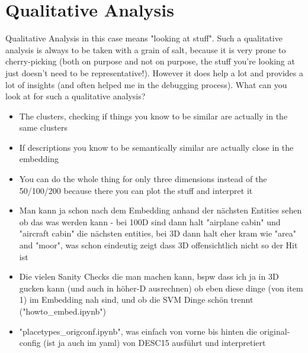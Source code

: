\documentclass[11pt,
  paper=a4, 
  twoside,  %
  hidelinks,
  bibliography=totocnumbered,
	captions=tableheading,
	BCOR=10mm
]{scrreprt}
\theoremstyle{definition}
\begin{document}
\section{Qualitative Analysis}

Qualitative Analysis in this case means "looking at stuff". Such a qualitative analysis is always to be taken with a grain of salt, because it is very prone to cherry-picking (both on purpose and not on purpose, the stuff you're looking at just doesn't need to be representative!). However it does help a lot and provides a lot of insights (and often helped me in the debugging process).
What can you look at for such a qualitative analysis?
\begin{itemize}
	\item The clusters, checking if things you know to be similar are actually in the same clusters
	\item If descriptions you know to be semantically similar are actually close in the embedding
	\item You can do the whole thing for only three dimensions instead of the 50/100/200 because there you can plot the stuff and interpret it
\end{itemize}

\begin{itemize}
	\item  Man kann ja schon nach dem Embedding anhand der nächsten Entities sehen ob das was werden kann - bei 100D sind dann halt "airplane cabin" und "aircraft cabin" die nächsten entities, bei 3D dann halt eher kram wie "area" and "moor", was schon eindeutig zeigt dass 3D offensichtlich nicht so der Hit ist
	\item Die vielen Sanity Checks die man machen kann, bspw dass ich ja in 3D gucken kann (und auch in höher-D ausrechnen) ob eben diese dinge (von item 1) im Embedding nah sind, und ob die SVM Dinge schön trennt ("howto_embed.ipynb")
	\item "placetypes_origconf.ipynb", was einfach von vorne bis hinten die original-config (ist ja auch im yaml) von DESC15 ausführt und interpretiert	
\end{itemize}
\end{document}

